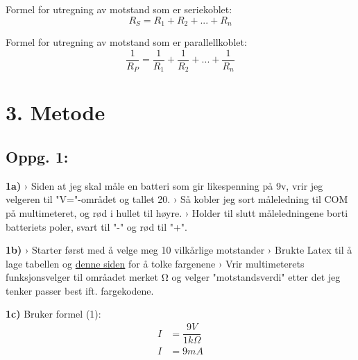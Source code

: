 \documentclass{article}
\begin{document}
        Formel for utregning av motstand som er seriekoblet:
        \begin{equation}
            R_S = R_1 + R_2 + ... + R_n
        \end{equation}

        Formel for utregning av motstand som er parallellkoblet:
        \begin{equation}
            \dfrac{1}{R_P} = \dfrac{1}{R_1} + \dfrac{1}{R_2} + ... + \dfrac{1}{R_n}
        \end{equation}

    \section*{3. Metode}
        \subsection*{Oppg. 1:}
            \textbf{1a)} \linebreak
            › Siden at jeg skal måle en batteri som gir likespenning på 9v, vrir jeg velgeren 
            til "V="-området og tallet 20. \linebreak
            › Så kobler jeg sort måleledning til COM på multimeteret, og rød i hullet til høyre. \linebreak
            › Holder til slutt måleledningene borti batteriets poler, svart til "-" og rød til "+". \linebreak
            
            \textbf{1b)} \linebreak
            › Starter først med å velge meg 10 vilkårlige motstander \linebreak
            › Brukte Latex til å lage tabellen og  \href{https://en.wikipedia.org/wiki/Electronic_color_code}{denne siden} 
            for å tolke fargenene \linebreak
            › Vrir  multimeterets  funksjonsvelger  til  områadet  merket Ω og velger "motstandsverdi" etter det jeg tenker passer 
            best ift. fargekodene.
            \pagebreak

            \textbf{1c)} \linebreak
            Bruker formel (1): \linebreak
            \begin{equation}
                \begin{split}
                    I &= \dfrac{9V}{1k\Omega} \\
                    I &= 9mA
                \end{split}
            \end{equation} \linebreak
\end{document}
